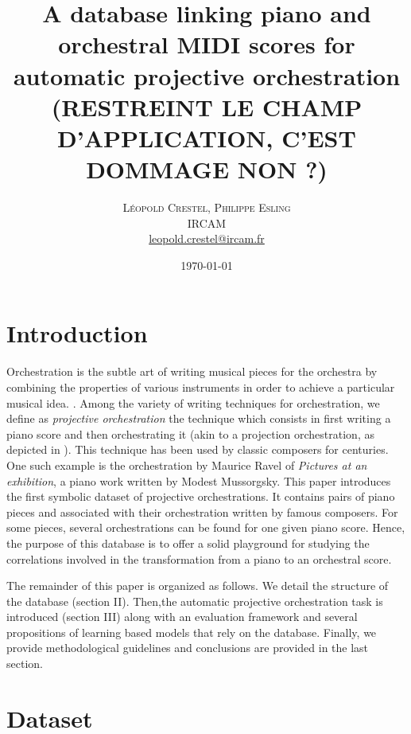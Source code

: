 \documentclass[twoside,twocolumn]{article}
\title{A database linking piano and orchestral MIDI scores for automatic projective orchestration \textbf{(RESTREINT LE CHAMP D'APPLICATION, C'EST DOMMAGE NON ?)}} %
\author{%
\textsc{L\'eopold Crestel, Philippe Esling}\\[1ex] %
\normalsize IRCAM \\ %
\normalsize \href{mailto:leopold.crestel@ircam.fr}{leopold.crestel@ircam.fr} %
}
\date{\today} %
\begin{document}
\maketitle


\section{Introduction}
Orchestration is the subtle art of writing musical pieces for the orchestra by combining the properties of various instruments in order to achieve a particular musical idea. \cite{koechli_orch,Rimsky-Korsakov:1873aa}. 
Among the variety of writing techniques for orchestration, we define as \textit{projective orchestration} \cite{esling2010dynamic} the technique which consists in first writing a piano score and then orchestrating it (akin to a projection orchestration, as depicted in ). 
This technique has been used by classic composers for centuries. One such example is the orchestration by Maurice Ravel of \textit{Pictures at an exhibition}, a piano work written by Modest Mussorgsky.
This paper introduces the first symbolic dataset of projective orchestrations.
It contains pairs of piano pieces and associated with their orchestration written by famous composers. For some pieces, several orchestrations can be found for one given piano score.
Hence, the purpose of this database is to offer a solid playground for studying the correlations involved in the transformation from a piano to an orchestral score.

The remainder of this paper is organized as follows. We detail the structure of the database (section II). Then,the automatic projective orchestration task is introduced (section III) along with an evaluation framework and several propositions of learning based models that rely on the database. Finally, we provide methodological guidelines and conclusions are provided in the last section.

\section{Dataset}
\end{document}
